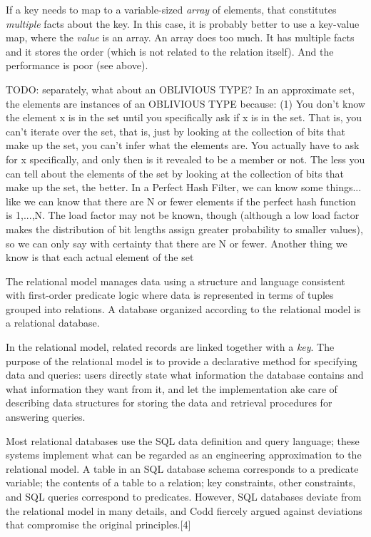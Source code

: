 \documentclass[ ../main.tex]{subfiles}
\begin{document}
If a key needs to map to a variable-sized \emph{array} of elements, that constitutes \emph{multiple} facts about the key. In this case, it is probably better to use a key-value map, where the \emph{value} is an array. An array does too much. It has multiple facts and it stores the order (which is not related to the relation itself). And the performance is poor (see above).


TODO: separately, what about an OBLIVIOUS TYPE? In an approximate set, the elements are instances of an OBLIVIOUS TYPE because:
(1) You don't know the element x is in the set until you specifically ask if x is in the set. That is, you can't iterate over the set, that is, just by looking at the collection of bits that make up the set, you can't infer what the elements are. You actually have to ask for x specifically, and only then is it revealed to be a member or not. The less you can tell about the elements of the set by looking at the collection of bits that make up the set, the better. In a Perfect Hash Filter, we can know some things... like we can know that there are N or fewer elements if the perfect hash function is 1,...,N. The load factor may not be known, though (although a low load factor makes the distribution of bit lengths assign greater probability to smaller values), so we can only say with certainty that there are N or fewer. Another thing we know is that each actual element of the set

The relational model manages data using a structure and language consistent with first-order predicate logic\cite{} where data is represented in terms of tuples grouped into relations. A database organized according to the relational model is a relational database.

In the relational model, related records are linked together with a \emph{key}. The purpose of the relational model is to provide a declarative method for specifying data and queries: users directly state what information the database contains and what information they want from it, and let the implementation ake care of describing data structures for storing the data and retrieval procedures for answering queries.

Most relational databases use the SQL data definition and query language; these systems implement what can be regarded as an engineering approximation to the relational model. A table in an SQL database schema corresponds to a predicate variable; the contents of a table to a relation; key constraints, other constraints, and SQL queries correspond to predicates. However, SQL databases deviate from the relational model in many details, and Codd fiercely argued against deviations that compromise the original principles.[4]
\end{document}
